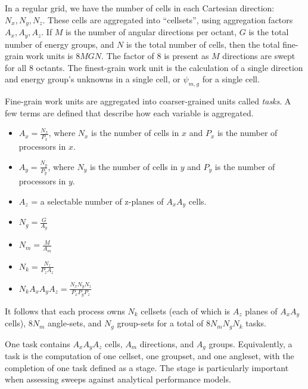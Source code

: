 In a regular grid, we have the  number of cells in each Cartesian direction: $N_x, N_y, N_z$. These cells are aggregated into ``cellsets'', using aggregation factors $A_x, A_y, A_z$. If $M$ is the number of angular directions per octant, $G$ is the total number of energy groups, and $N$ is the total number of cells, then the total fine-grain work units is $8MGN$. The factor of 8 is present as $M$ directions are swept for all 8 octants. The finest-grain work unit is the calculation of a single direction and energy group's unknowns in a single cell, or $\psi_{m,g}$ for a single cell.

Fine-grain work units are aggregated into coarser-grained units called \textit{tasks}. A few terms are defined that describe how each variable is aggregated.
\begin{itemize}
\item $A_x = \frac{N_x}{P_x}$, where $N_x$ is the number of cells in $x$ and $P_x$ is the number of processors in $x$.
\item $A_y = \frac{N_y}{P_y}$, where $N_y$ is the number of cells in $y$ and $P_y$ is the number of processors in $y$.
\item $A_z$ = a selectable number of z-planes of $A_x A_y$ cells.
\item $N_g = \frac{G}{A_g}$
\item $N_m = \frac{M}{A_m}$
\item $N_k = \frac{N_z}{P_z A_z}$
\item $N_k A_x A_y A_z = \frac{N_x N_y N_z}{P_x P_y P_z}$
\end{itemize}

It follows that each process owns $N_k$ cellsets (each of which is $A_z$ planes of $A_x A_y$ cells), $8N_m$ angle-sets, and $N_g$ group-sets for a total of $8N_m N_g N_k$ tasks.

One task contains $A_x A_y A_z$ cells, $A_m$ directions, and $A_g$ groups. Equivalently, a task is the computation of one cellset, one groupset, and one angleset, with the completion of one task defined as a stage.  The stage is particularly important when assessing sweeps against analytical performance models. 


